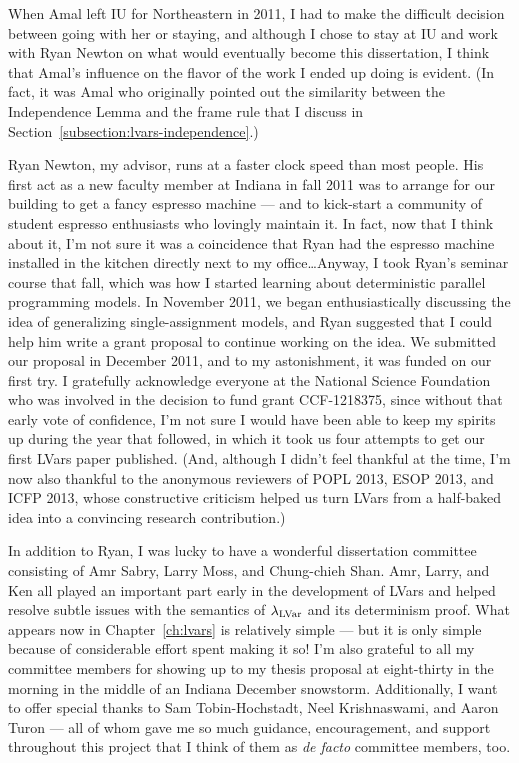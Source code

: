 When Amal left IU for Northeastern in 2011, I had to make the
difficult decision between going with her or staying, and although I
chose to stay at IU and work with Ryan Newton on what would eventually
become this dissertation, I think that Amal's influence on the flavor
of the work I ended up doing is evident.  (In fact, it was Amal who
originally pointed out the similarity between the Independence Lemma
and the frame rule that I discuss in
Section~\ref{subsection:lvars-independence}.)

Ryan Newton, my advisor, runs at a faster clock speed than most
people.  His first act as a new faculty member at Indiana in fall 2011
was to arrange for our building to get a fancy espresso machine ---
and to kick-start a community of student espresso enthusiasts who
lovingly maintain it.  In fact, now that I think about it, I'm not
sure it was a coincidence that Ryan had the espresso machine installed
in the kitchen directly next to my office\dots Anyway, I took Ryan's
seminar course that fall, which was how I started learning about
deterministic parallel programming models.  In November 2011, we began
enthusiastically discussing the idea of generalizing single-assignment
models, and Ryan suggested that I could help him write a grant
proposal to continue working on the idea.  We submitted our proposal
in December 2011, and to my astonishment, it was funded on our first
try.  I gratefully acknowledge everyone at the National Science
Foundation who was involved in the decision to fund grant CCF-1218375,
since without that early vote of confidence, I'm not sure I would have
been able to keep my spirits up during the year that followed, in
which it took us four attempts to get our first LVars paper published.
(And, although I didn't feel thankful at the time, I'm now also
thankful to the anonymous reviewers of POPL 2013, ESOP 2013, and ICFP
2013, whose constructive criticism helped us turn LVars from a
half-baked idea into a convincing research contribution.)

In addition to Ryan, I was lucky to have a wonderful dissertation
committee consisting of Amr Sabry, Larry Moss, and Chung-chieh Shan.
Amr, Larry, and Ken all played an important part early in the
development of LVars and helped resolve subtle issues with the
semantics of $\lambda_{\textrm{LVar}}$ and its determinism proof.  What appears
now in Chapter~\ref{ch:lvars} is relatively simple --- but it is only
simple because of considerable effort spent making it so!  I'm also
grateful to all my committee members for showing up to my thesis
proposal at eight-thirty in the morning in the middle of an Indiana
December snowstorm.  Additionally, I want to offer special thanks to
Sam Tobin-Hochstadt, Neel Krishnaswami, and Aaron Turon --- all of
whom gave me so much guidance, encouragement, and support throughout
this project that I think of them as \emph{de facto} committee
members, too.

